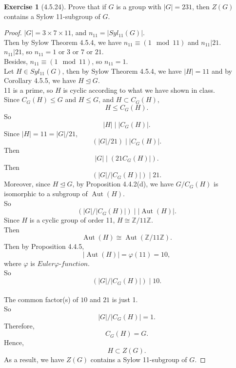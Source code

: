 \documentclass{amsart}
\newcommand{\bbz}{\mathbb{Z}}
\theoremstyle{plain}
\theoremstyle{definition}
\newtheorem{exer}[lem]{Exercise}
\begin{document}
\begin{exer}[4.5.24]
Prove that if $G$ is a group with $|G|=231$, then $Z(G)$ contains a Sylow 11-subgroup of $G$.
\end{exer}
\begin{proof}
	$|G| = 3 \times 7 \times 11$, and $n_{11} = |Syl_{11}(G)|$.\\
	Then by Sylow Theorem 4.5.4, we have $n_{11} \equiv (1 \mod{11})$ and $n_{11} | 21$.\\
	$n_{11} | 21$, so $n_{11} = 1$ or $3$ or $7$ or $21$.\\
	Besides, $n_{11} \equiv (1 \mod{11})$, so $n_{11} = 1$.\\
	Let $H \in Syl_{11}(G)$, then by Sylow Theorem 4.5.4, we have $|H|=11$ and by Corollary 4.5.5, we have $H \unlhd G$. \\
	11 is a prime, so $H$ is cyclic according to what we have shown in class.\\
	Since $C_G(H) \leq G$ and $H \leq G$, and $H \subset C_G(H)$, 
	\[H \leq C_G(H).\]
	So
	\[|H| \mid |C_G(H)|. \]
	Since $|H| = 11 = |G|/21$,
	\[(|G|/21) \mid |C_G(H)|.\]	
	Then 
	\[|G| \mid (21C_G(H)|) .\]
	Then 
	\[\left(|G|/|C_G(H)|\right) \mid 21.\]
	Moreover, since $H\unlhd G$, by Proposition 4.4.2(d), we have $G/C_G(H)$ is isomorphic to a subgroup of $\operatorname{Aut}(H)$.\\
	So 
	\[\left(|G|/|C_G(H)|\right) \mid |\operatorname{Aut}(H)|.\]
	Since $H$ is a cyclic group of order 11, $H\cong \bbz/11\bbz$.\\
	Then 
	\[\operatorname{Aut}(H) \cong \operatorname{Aut}(\bbz/11\bbz).\]
	Then by Proposition 4.4.5, 
	\[|\operatorname{Aut}(H)| = \varphi(11) = 10,\]
	where $\varphi$ is $Euler \varphi$-$function$.\\
	So 
	\[\left(|G|/|C_G(H)|\right) \mid 10.\]\\
	The common factor(s) of $10$ and $21$ is just 1.\\
	So 
	\[|G|/|C_G(H)| = 1.\]
	Therefore,
	\[C_G(H) = G.\]
	Hence,
	\[H \subset Z(G).\]
	As a result, we have $Z(G)$ contains a Sylow 11-subgroup of $G$.
\end{proof}
\end{document}
